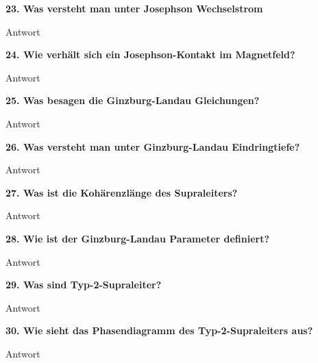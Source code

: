 \noindent\textbf{23. Was versteht man unter Josephson Wechselstrom}\\
\begin{addmargin}[25pt]{0pt}
Antwort\\
\end{addmargin}

\noindent\textbf{24. Wie verhält sich ein Josephson-Kontakt im Magnetfeld?}\\
\begin{addmargin}[25pt]{0pt}
Antwort\\
\end{addmargin}

\noindent\textbf{25. Was besagen die Ginzburg-Landau Gleichungen?}\\
\begin{addmargin}[25pt]{0pt}
Antwort\\
\end{addmargin}

\noindent\textbf{26. Was versteht man unter Ginzburg-Landau Eindringtiefe?}\\
\begin{addmargin}[25pt]{0pt}
Antwort\\
\end{addmargin}

\noindent\textbf{27. Was ist die Kohärenzlänge des Supraleiters?}\\
\begin{addmargin}[25pt]{0pt}
Antwort\\
\end{addmargin}

\noindent\textbf{28. Wie ist der Ginzburg-Landau Parameter definiert?}\\
\begin{addmargin}[25pt]{0pt}
Antwort\\
\end{addmargin}

\noindent\textbf{29. Was sind Typ-2-Supraleiter?}\\
\begin{addmargin}[25pt]{0pt}
Antwort\\
\end{addmargin}

\noindent\textbf{30. Wie sieht das Phasendiagramm des Typ-2-Supraleiters aus?}\\
\begin{addmargin}[25pt]{0pt}
Antwort\\
\end{addmargin}

